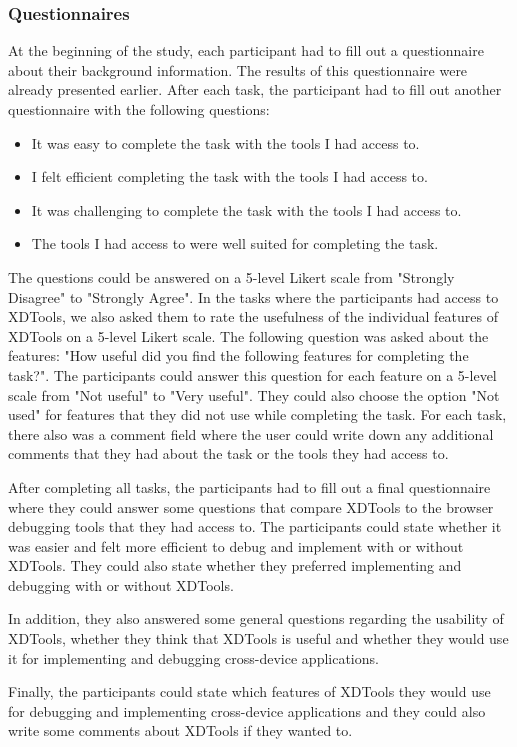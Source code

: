 \subsubsection{Questionnaires}
At the beginning of the study, each participant had to fill out a questionnaire about their background information. The results of this questionnaire were already presented earlier. After each task, the participant had to fill out another questionnaire with the following questions:
\begin{itemize}
	\item It was easy to complete the task with the tools I had access to.
	\item I felt efficient completing the task with the tools I had access to.
	\item It was challenging to complete the task with the tools I had access to.
	\item The tools I had access to were well suited for completing the task.
\end{itemize}
The questions could be answered on a 5-level Likert scale from "Strongly Disagree" to "Strongly Agree". In the tasks where the participants had access to XDTools, we also asked them to rate the usefulness of the individual features of XDTools on a 5-level Likert scale. The following question was asked about the features: "How useful did you find the following features for completing the task?". The participants could answer this question for each feature on a 5-level scale from "Not useful" to "Very useful". They could also choose the option "Not used" for features that they did not use while completing the task. For each task, there also was a comment field where the user could write down any additional comments that they had about the task or the tools they had access to.

After completing all tasks, the participants had to fill out a final questionnaire where they could answer some questions that compare XDTools to the browser debugging tools that they had access to. The participants could state whether it was easier and felt more efficient to debug and implement with or without XDTools. They could also state whether they preferred implementing and debugging with or without XDTools.

In addition, they also answered some general questions regarding the usability of XDTools, whether they think that XDTools is useful and whether they would use it for implementing and debugging cross-device applications. 

Finally, the participants could state which features of XDTools they would use for debugging and implementing cross-device applications and they could also write some comments about XDTools if they wanted to.

